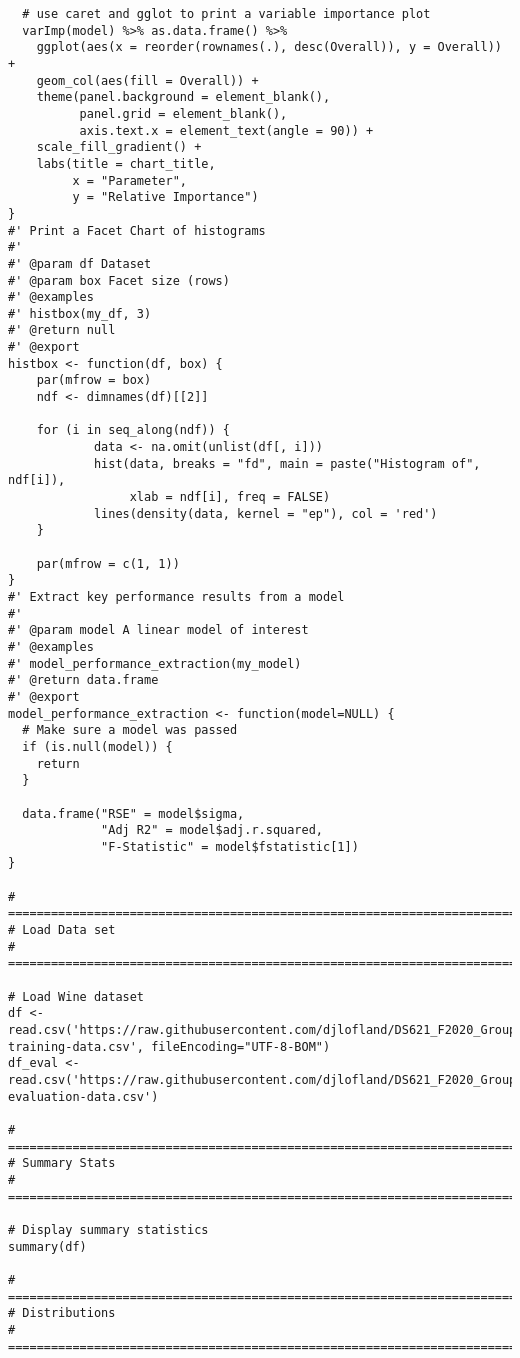 \documentclass[
]{article}
\begin{document}
\begin{verbatim}
  # use caret and gglot to print a variable importance plot
  varImp(model) %>% as.data.frame() %>% 
    ggplot(aes(x = reorder(rownames(.), desc(Overall)), y = Overall)) +
    geom_col(aes(fill = Overall)) +
    theme(panel.background = element_blank(),
          panel.grid = element_blank(),
          axis.text.x = element_text(angle = 90)) +
    scale_fill_gradient() +
    labs(title = chart_title,
         x = "Parameter",
         y = "Relative Importance")
}
#' Print a Facet Chart of histograms
#'
#' @param df Dataset
#' @param box Facet size (rows)
#' @examples
#' histbox(my_df, 3)
#' @return null
#' @export
histbox <- function(df, box) {
    par(mfrow = box)
    ndf <- dimnames(df)[[2]]
    
    for (i in seq_along(ndf)) {
            data <- na.omit(unlist(df[, i]))
            hist(data, breaks = "fd", main = paste("Histogram of", ndf[i]),
                 xlab = ndf[i], freq = FALSE)
            lines(density(data, kernel = "ep"), col = 'red')
    }
    
    par(mfrow = c(1, 1))
}
#' Extract key performance results from a model
#'
#' @param model A linear model of interest
#' @examples
#' model_performance_extraction(my_model)
#' @return data.frame
#' @export
model_performance_extraction <- function(model=NULL) {
  # Make sure a model was passed
  if (is.null(model)) {
    return
  }
  
  data.frame("RSE" = model$sigma,
             "Adj R2" = model$adj.r.squared,
             "F-Statistic" = model$fstatistic[1])
}

# =====================================================================================
# Load Data set
# =====================================================================================

# Load Wine dataset
df <- read.csv('https://raw.githubusercontent.com/djlofland/DS621_F2020_Group3/master/Homework_5/datasets/wine-training-data.csv', fileEncoding="UTF-8-BOM")
df_eval <- read.csv('https://raw.githubusercontent.com/djlofland/DS621_F2020_Group3/master/Homework_5/datasets/wine-evaluation-data.csv')

# =====================================================================================
# Summary Stats 
# =====================================================================================

# Display summary statistics
summary(df)

# =====================================================================================
# Distributions
# =====================================================================================


\end{verbatim}
\end{document}
